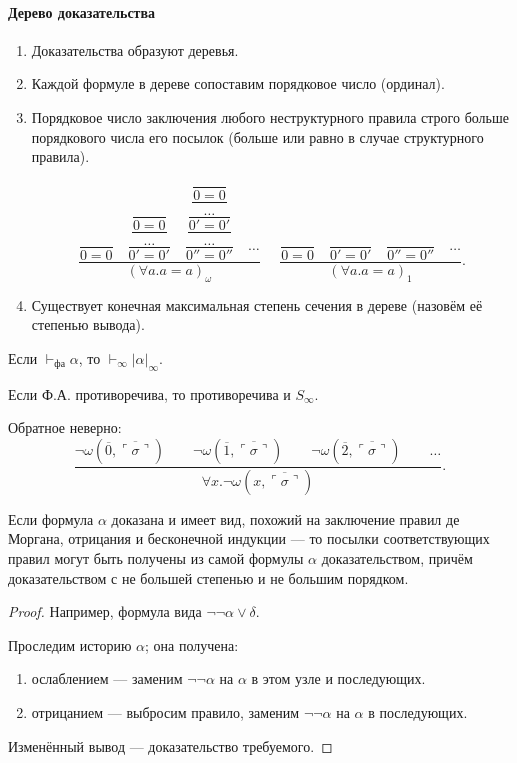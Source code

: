 \paragraph{Дерево доказательства}
\begin{enumerate}
\item Доказательства образуют деревья.
\item Каждой формуле в дереве сопоставим порядковое число (ординал).
\item Порядковое число заключения любого неструктурного правила строго больше порядкового числа его посылок
(больше или равно в случае структурного правила).

\[ \dfrac{
   \dfrac{}{0 = 0}\quad
   \dfrac{\dfrac{\dfrac{}{0= 0}}{\dots}}{0'= 0'}\quad
   \dfrac{\dfrac{\dfrac{\dfrac{\dfrac{}{0 = 0}}{\dots}}{0'= 0'}}{\dots}}{0''= 0''}\quad\dots
}{(\forall a.a = a)_\omega}~~~~~~
\dfrac{
   \dfrac{}{0 = 0}\quad
   \dfrac{}{0'= 0'}\quad
   \dfrac{}{0''= 0''}\quad\dots
}{(\forall a.a = a)_1}. \]

\item Существует конечная максимальная степень сечения в дереве (назовём её степенью вывода).
\end{enumerate}


\begin{theorem}
  Если $\vdash_\text{фа}\alpha$, то $\vdash_\infty|\alpha|_\infty$.
\end{theorem}
\begin{theorem}
  Если Ф.А. противоречива, то противоречива и $S_\infty$.
\end{theorem}
\begin{example}
  Обратное неверно: \[ \dfrac
{\neg\omega(\overline{0},\overline{\ulcorner\sigma\urcorner})\quad\quad
 \neg\omega(\overline{1},\overline{\ulcorner\sigma\urcorner})\quad\quad
 \neg\omega(\overline{2},\overline{\ulcorner\sigma\urcorner})\quad\quad\dots}{\forall x.\neg\omega(x,\overline{\ulcorner\sigma\urcorner})}.\]
\end{example}


\begin{theorem}
Если формула $\alpha$ доказана и имеет вид, похожий на заключение правил де Моргана,
отрицания и бесконечной индукции --- то посылки соответствующих правил могут быть получены из самой
формулы $\alpha$ доказательством, причём доказательством с не большей степенью и не большим порядком.
\end{theorem}
\begin{proof}
Например, формула вида $\neg\neg \alpha\vee\delta$.

Проследим историю $\alpha$; она получена:
\begin{enumerate}
\item ослаблением --- заменим $\neg\neg\alpha$ на $\alpha$ в этом узле и последующих.
\item отрицанием --- выбросим правило, заменим $\neg\neg\alpha$ на $\alpha$ в последующих.
\end{enumerate}
Изменённый вывод --- доказательство требуемого.
\end{proof}


